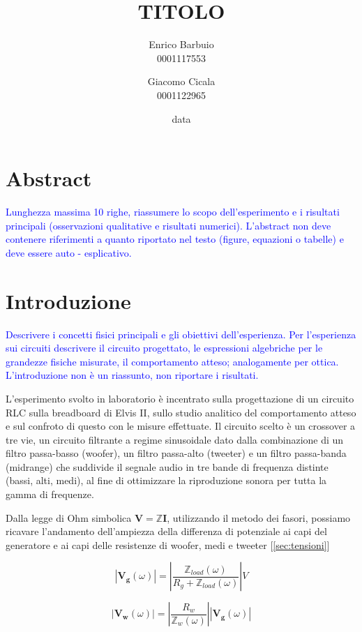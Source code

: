 \documentclass[12pt,italian]{article}
\title{TITOLO}
\author{Enrico Barbuio \\ 0001117553 \and Giacomo Cicala \\ 0001122965}
\date{data}
\newcommand{\prof}[1]{\textcolor{blue}{#1}}
\begin{document}
\maketitle
\section*{Abstract}
\prof{ Lunghezza massima 10 righe, riassumere lo scopo dell'esperimento e i
  risultati principali (osservazioni qualitative e risultati numerici).
  L'abstract non deve contenere riferimenti a quanto riportato nel testo
  (figure, equazioni o tabelle) e deve essere auto - esplicativo. }

\section*{Introduzione}
\prof{ Descrivere i concetti fisici principali e gli obiettivi dell'esperienza.
  Per l'esperienza sui circuiti descrivere il circuito progettato, le
  espressioni algebriche per le grandezze fisiche misurate, il comportamento
  atteso; analogamente per ottica. L'introduzione non è un riassunto, non
  riportare i risultati.}

L'esperimento svolto in laboratorio è incentrato sulla progettazione di un
circuito RLC sulla breadboard di Elvis II, sullo studio analitico del
comportamento atteso e sul confroto di questo con le misure effettuate. Il
circuito scelto è un crossover a tre vie, un circuito filtrante a regime
sinusoidale dato dalla combinazione di un filtro passa-basso (woofer), un
filtro passa-alto (tweeter) e un filtro passa-banda (midrange) che suddivide il
segnale audio in tre bande di frequenza distinte (bassi, alti, medi), al fine
di ottimizzare la riproduzione sonora per tutta la gamma di frequenze.

Dalla legge di Ohm simbolica $\textbf{V} = \mathbb{Z} \textbf{I}$, utilizzando
il metodo dei fasori, possiamo ricavare l'andamento dell'ampiezza della
differenza di potenziale ai capi del generatore e ai capi delle resistenze di
woofer, medi e tweeter [\ref{sec:tensioni}]%

\begin{equation}
  \left| \mathbf{V_{g}}(\omega) \right| = \left| \frac{\mathbb{Z}_{load}(\omega)}
  {R_{g}+\mathbb{Z}_{load}(\omega)}\right|V
  \label{eq:Vg}
\end{equation}

\begin{equation}
  \left| \mathbf{V_{w}}(\omega) \right| = \left| \frac{R_{w}}
  {\mathbb{Z}_{w}(\omega)}\right|\left| \mathbf{V_{g}}(\omega) \right|
  \label{eq:Vw}
\end{equation}
\end{document}
